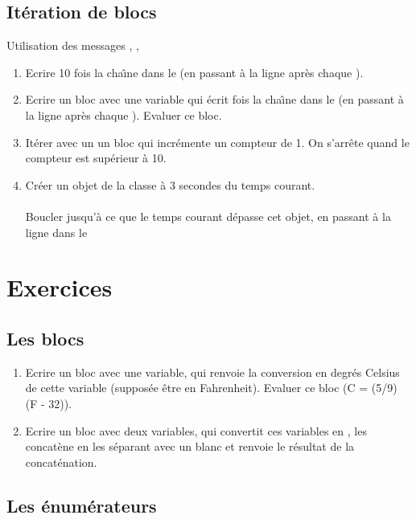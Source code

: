 \subsection{It\'eration de blocs}

Utilisation des messages , ,

\begin{enumerate}
\item Ecrire 10 fois la cha\^{\i}ne  dans le 
(en passant \`a la ligne apr\`es chaque ).

\item Ecrire un bloc avec une variable  qui \'ecrit  fois la cha\^{\i}ne  dans le 
(en passant \`a la ligne apr\`es chaque ). Evaluer ce bloc.

\item It\'erer avec un  un bloc qui incr\'emente un compteur de 1.
On s'arr\^ete quand le compteur est sup\'erieur \`a 10.
\item
Cr\'eer un objet de la classe  \`a 3 secondes du temps courant.\\
\\
Boucler jusqu'\`a ce que le temps courant d\'epasse cet objet,
en passant \`a la ligne dans le 
\end{enumerate}

\section{Exercices}

\subsection{Les blocs}
\begin{enumerate}
\item
Ecrire un bloc avec une variable, qui renvoie la conversion en degr\'es
Celsius de cette variable (suppos\'ee \^etre en Fahrenheit).
Evaluer ce bloc (C = (5/9) (F - 32)).
\item
Ecrire un bloc avec deux variables, qui convertit ces variables en
, les concat\`ene en les s\'eparant avec un blanc
et renvoie le r\'esultat de la concat\'enation.
\end{enumerate}


\subsection{Les \'enum\'erateurs}

